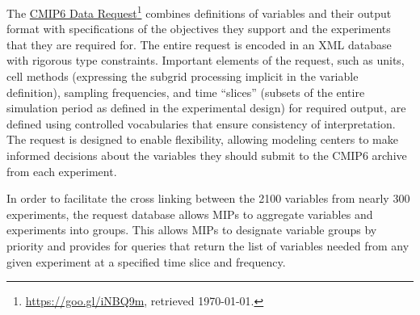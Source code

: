 \documentclass[gmd,manuscript]{copernicus}
\newcommand{\urlref}[2] {\href{#1}{#2}\footnote{\url{#1}, retrieved \today.}}
\begin{document}
The \urlref{https://goo.gl/iNBQ9m}{CMIP6 Data Request}
\citep{ref:juckesetal2015} combines definitions of variables and their
output format with specifications of the objectives they support and
the experiments that they are required for. The entire request is
encoded in an XML database with rigorous type constraints. Important
elements of the request, such as units, cell methods (expressing the
subgrid processing implicit in the variable definition), sampling
frequencies, and time ``slices'' (subsets of the entire simulation
period as defined in the experimental design) for required output, are
defined using controlled vocabularies that ensure
consistency of interpretation. The request is designed to enable flexibility,
allowing modeling centers to make informed decisions about the
variables they should submit to the CMIP6 archive from each
experiment.



In order to facilitate the cross linking between the 2100 variables
from nearly 300 experiments, the request database allows MIPs to aggregate
variables and experiments into groups. This allows MIPs to designate
variable groups by priority and provides for queries that return the
list of variables needed
from any given experiment at a specified time slice and
frequency.

\end{document}
